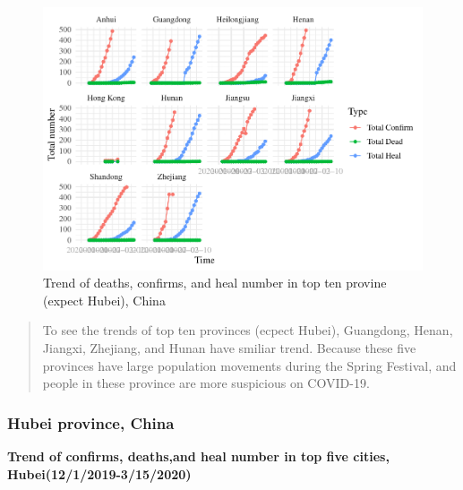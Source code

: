 \documentclass[12pt,]{article}
\begin{document}
\begin{figure}
\centering
\includegraphics{Feng_ENV872_Project_files/figure-latex/TenProvinces_Number_Trend.plot (expect Hubei)-1.pdf}
\caption{Trend of deaths, confirms, and heal number in top ten provine
(expect Hubei), China}
\end{figure}

\begin{quote}
To see the trends of top ten provinces (ecpect Hubei), Guangdong, Henan,
Jiangxi, Zhejiang, and Hunan have smiliar trend. Because these five
provinces have large population movements during the Spring Festival,
and people in these province are more suspicious on COVID-19.
\end{quote}

\hypertarget{hubei-province-china}{%
\subsubsection{Hubei province, China}\label{hubei-province-china}}

\textbf{Trend of confirms, deaths,and heal number in top five cities,
Hubei(12/1/2019-3/15/2020)}
\end{document}
